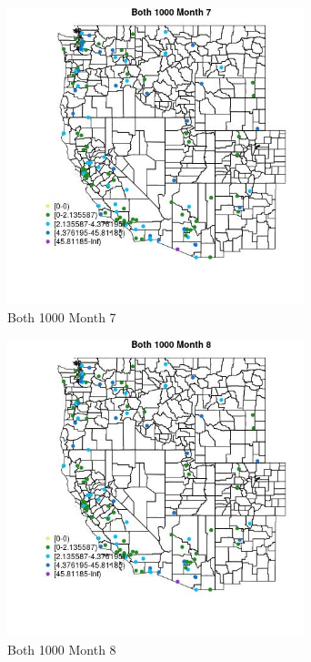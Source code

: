 \begin{figure} 
\centering  
\includegraphics[width=0.77\textwidth]{Code_Outputs/Report_ML_input_PM25_Step4_part_e_de_duplicated_aves_MapObsMo7Both_1000.jpg} 
\caption{\label{fig:Report_ML_input_PM25_Step4_part_e_de_duplicated_avesMapObsMo7Both_1000}Both 1000 Month 7} 
\end{figure} 
 

\begin{figure} 
\centering  
\includegraphics[width=0.77\textwidth]{Code_Outputs/Report_ML_input_PM25_Step4_part_e_de_duplicated_aves_MapObsMo8Both_1000.jpg} 
\caption{\label{fig:Report_ML_input_PM25_Step4_part_e_de_duplicated_avesMapObsMo8Both_1000}Both 1000 Month 8} 
\end{figure} 
 

